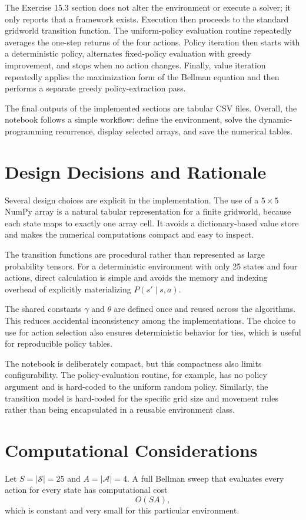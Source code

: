 \documentclass[11pt,a4paper]{article}
\newcommand{\code}[1]{\texttt{\detokenize{#1}}}
\begin{document}
The Exercise 15.3 section does not alter the environment or execute a solver; it only reports that a framework exists. Execution then proceeds to the standard gridworld transition function. The uniform-policy evaluation routine repeatedly averages the one-step returns of the four actions. Policy iteration then starts with a deterministic policy, alternates fixed-policy evaluation with greedy improvement, and stops when no action changes. Finally, value iteration repeatedly applies the maximization form of the Bellman equation and then performs a separate greedy policy-extraction pass.

The final outputs of the implemented sections are tabular CSV files. Overall, the notebook follows a simple workflow: define the environment, solve the dynamic-programming recurrence, display selected arrays, and save the numerical tables.

\section{Design Decisions and Rationale}
Several design choices are explicit in the implementation. The use of a \(5\times5\) NumPy array is a natural tabular representation for a finite gridworld, because each state maps to exactly one array cell. It avoids a dictionary-based value store and makes the numerical computations compact and easy to inspect.

The transition functions are procedural rather than represented as large probability tensors. For a deterministic environment with only 25 states and four actions, direct calculation is simple and avoids the memory and indexing overhead of explicitly materializing \(P(s'\mid s,a)\).

The shared constants \(\gamma\) and \(\theta\) are defined once and reused across the algorithms. This reduces accidental inconsistency among the implementations. The choice to use \code{np.argmax} for action selection also ensures deterministic behavior for ties, which is useful for reproducible policy tables.

The notebook is deliberately compact, but this compactness also limits configurability. The policy-evaluation routine, for example, has no policy argument and is hard-coded to the uniform random policy. Similarly, the transition model is hard-coded for the specific grid size and movement rules rather than being encapsulated in a reusable environment class.

\section{Computational Considerations}
Let \(S=|\mathcal{S}|=25\) and \(A=|\mathcal{A}|=4\). A full Bellman sweep that evaluates every action for every state has computational cost
\begin{equation}
O(SA),
\end{equation}
which is constant and very small for this particular environment.
\end{document}
